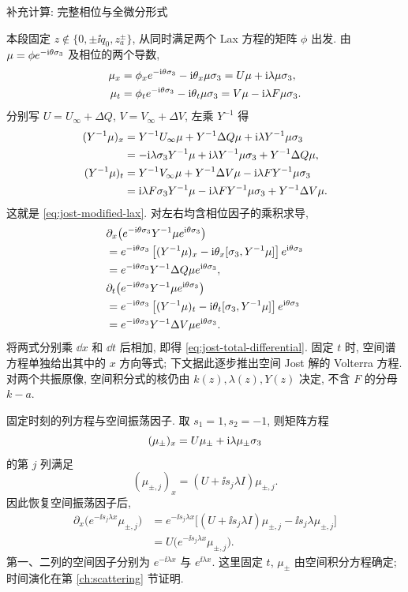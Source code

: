 \par\medskip\noindent 补充计算: 完整相位与全微分形式\par
本段固定 $z\notin\{0,\pm\ii q_0,z_a^\pm\}$, 从同时满足两个 Lax 方程的矩阵 $\phi$ 出发.
由 $\mu=\phi e^{-\mathrm{i}\theta\sigma_3}$ 及相位的两个导数,
\begin{align*}
\mu_x&=\phi_xe^{-\mathrm{i}\theta\sigma_3}-\mathrm{i}\theta_x\mu\sigma_3
=U\mu+\mathrm{i}\lambda\mu\sigma_3,\\
\mu_t&=\phi_te^{-\mathrm{i}\theta\sigma_3}-\mathrm{i}\theta_t\mu\sigma_3
=V\mu-\mathrm{i}\lambda F\mu\sigma_3.
\end{align*}
分别写 $U=U_\infty+\Delta Q$, $V=V_\infty+\Delta V$, 左乘 $Y^{-1}$ 得
\begin{align*}
(Y^{-1}\mu)_x
&=Y^{-1}U_\infty\mu+Y^{-1}\Delta Q\mu+\mathrm{i}\lambda Y^{-1}\mu\sigma_3\\
&=-\mathrm{i}\lambda\sigma_3 Y^{-1}\mu+\mathrm{i}\lambda Y^{-1}\mu\sigma_3+Y^{-1}\Delta Q\mu,\\
(Y^{-1}\mu)_t
&=Y^{-1}V_\infty\mu+Y^{-1}\Delta V\mu-\mathrm{i}\lambda F Y^{-1}\mu\sigma_3\\
&=\mathrm{i}\lambda F\sigma_3 Y^{-1}\mu-\mathrm{i}\lambda F Y^{-1}\mu\sigma_3+Y^{-1}\Delta V\mu.
\end{align*}
这就是 \eqref{eq:jost-modified-lax}. 对左右均含相位因子的乘积求导,
\begin{align*}
&\partial_x\!\left(e^{-\mathrm{i}\theta\sigma_3}Y^{-1}\mu e^{\mathrm{i}\theta\sigma_3}\right)\\
&=e^{-\mathrm{i}\theta\sigma_3}
\left[(Y^{-1}\mu)_x-\mathrm{i}\theta_x[\sigma_3,Y^{-1}\mu]\right]e^{\mathrm{i}\theta\sigma_3}\\
&=e^{-\mathrm{i}\theta\sigma_3}Y^{-1}\Delta Q\mu e^{\mathrm{i}\theta\sigma_3},\\
&\partial_t\!\left(e^{-\mathrm{i}\theta\sigma_3}Y^{-1}\mu e^{\mathrm{i}\theta\sigma_3}\right)\\
&=e^{-\mathrm{i}\theta\sigma_3}
\left[(Y^{-1}\mu)_t-\mathrm{i}\theta_t[\sigma_3,Y^{-1}\mu]\right]e^{\mathrm{i}\theta\sigma_3}\\
&=e^{-\mathrm{i}\theta\sigma_3}Y^{-1}\Delta V\mu e^{\mathrm{i}\theta\sigma_3}.
\end{align*}
将两式分别乘 $\dd x$ 和 $\dd t$ 后相加, 即得 \eqref{eq:jost-total-differential}.
固定 $t$ 时, 空间谱方程单独给出其中的 $x$ 方向等式;
下文据此逐步推出空间 Jost 解的 Volterra 方程. 对两个共振原像,
空间积分式的核仍由 $k(z),\lambda(z),Y(z)$ 决定, 不含 $F$ 的分母 $k-a$.



\par\smallskip\noindent 固定时刻的列方程与空间振荡因子.\quad
取 $s_1=1,s_2=-1$, 则矩阵方程
\begin{equation*}
(\mu_\pm)_x=U\mu_\pm+\mathrm{i}\lambda\mu_\pm\sigma_3
\end{equation*}
的第 $j$ 列满足
\begin{equation*}
(\mu_{\pm,j})_x=(U+\ii s_j\lambda I)\mu_{\pm,j}.
\end{equation*}
因此恢复空间振荡因子后,
\begin{align*}
\partial_x\bigl(e^{-\ii s_j\lambda x}\mu_{\pm,j}\bigr)
&=e^{-\ii s_j\lambda x}
\bigl[(U+\ii s_j\lambda I)\mu_{\pm,j}
-\ii s_j\lambda\mu_{\pm,j}\bigr]\\
&=U\bigl(e^{-\ii s_j\lambda x}\mu_{\pm,j}\bigr).
\end{align*}
第一、二列的空间因子分别为 $e^{-\ii\lambda x}$ 与 $e^{\ii\lambda x}$.
这里固定 $t$, $\mu_\pm$ 由空间积分方程确定; 时间演化在第 \ref{ch:scattering} 节证明.

